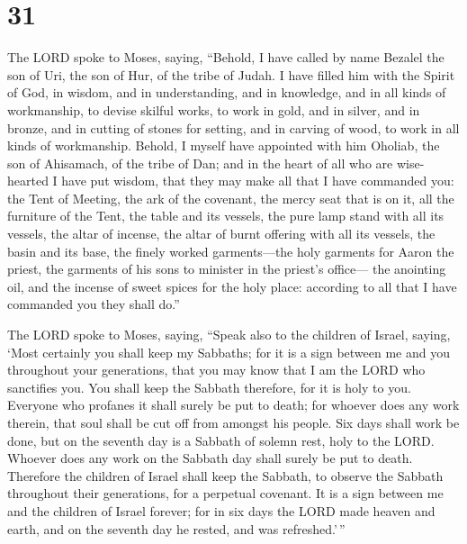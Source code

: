 \hypertarget{section-30}{%
\section{31}\label{section-30}}

 The LORD spoke to Moses, saying,  ``Behold,
I have called by name Bezalel the son of Uri, the son of Hur, of the
tribe of Judah.  I have filled him with the Spirit of God,
in wisdom, and in understanding, and in knowledge, and in all kinds of
workmanship,  to devise skilful works, to work in gold,
and in silver, and in bronze,  and in cutting of stones
for setting, and in carving of wood, to work in all kinds of
workmanship.  Behold, I myself have appointed with him
Oholiab, the son of Ahisamach, of the tribe of Dan; and in the heart of
all who are wise-hearted I have put wisdom, that they may make all that
I have commanded you:  the Tent of Meeting, the ark of the
covenant, the mercy seat that is on it, all the furniture of the Tent,
 the table and its vessels, the pure lamp stand with all
its vessels, the altar of incense,  the altar of burnt
offering with all its vessels, the basin and its base, 
the finely worked garments---the holy garments for Aaron the priest, the
garments of his sons to minister in the priest's office---
 the anointing oil, and the incense of sweet spices for
the holy place: according to all that I have commanded you they shall
do.''

 The LORD spoke to Moses, saying,  ``Speak
also to the children of Israel, saying, `Most certainly you shall keep
my Sabbaths; for it is a sign between me and you throughout your
generations, that you may know that I am the LORD who sanctifies you.
 You shall keep the Sabbath therefore, for it is holy to
you. Everyone who profanes it shall surely be put to death; for whoever
does any work therein, that soul shall be cut off from amongst his
people.  Six days shall work be done, but on the seventh
day is a Sabbath of solemn rest, holy to the LORD. Whoever does any work
on the Sabbath day shall surely be put to death. 
Therefore the children of Israel shall keep the Sabbath, to observe the
Sabbath throughout their generations, for a perpetual covenant.
 It is a sign between me and the children of Israel
forever; for in six days the LORD made heaven and earth, and on the
seventh day he rested, and was refreshed.'\,''

